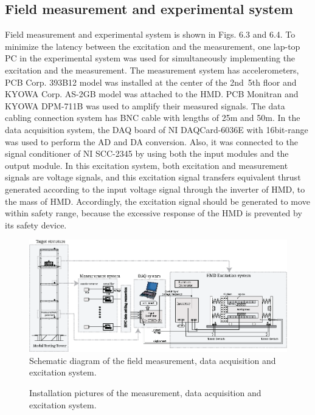 \subsection{Field measurement and experimental system}
Field measurement and experimental system is shown in Figs. 6.3 and 6.4. To minimize the latency between the excitation and the measurement, one lap-top PC in the experimental system was used for simultaneously implementing the excitation and the measurement. The measurement system has accelerometers, PCB Corp. 393B12 model was installed at the center of the 2nd~5th floor and KYOWA Corp. AS-2GB model was attached to the HMD. PCB Monitran and KYOWA DPM-711B was used to amplify their measured signals. The data cabling connection system has BNC cable with lengths of 25m and 50m. In the data acquisition system, the DAQ board of NI DAQCard-6036E with 16bit-range was used to perform the AD and DA conversion. Also, it was connected to the signal conditioner of NI SCC-2345 by using both the input modules and the output module. 
In this excitation system, both excitation and measurement signals are voltage signals, and this excitation signal transfers equivalent thrust generated according to the input voltage signal through the inverter of HMD, to the mass of HMD. Accordingly, the excitation signal should be generated to move within safety range, because the excessive response of the HMD is prevented by its safety device.

\begin{figure}[ht]
\centering
\includegraphics[width=1\textwidth] {figure/7-3.eps}
\caption{Schematic diagram of the field measurement, data acquisition and excitation system.}
\label{fig:7-3}
\end{figure}

\begin{figure}[!ht]
\centering
{}
\caption{Installation pictures of the measurement, data acquisition and excitation system.}
\label{fig:7-4}
\end{figure}

